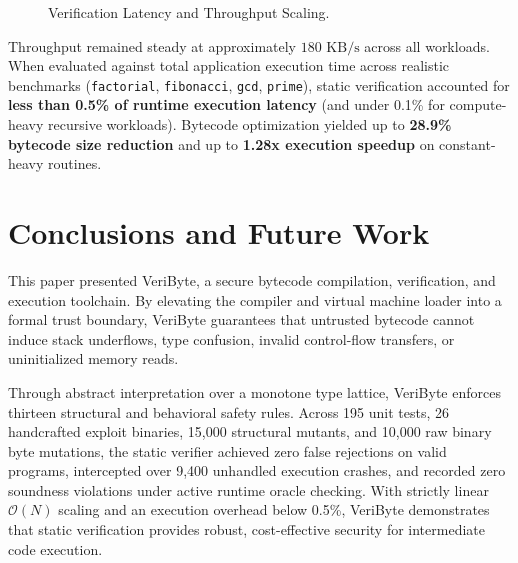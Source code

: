 \documentclass[conference]{IEEEtran}
\begin{document}
\begin{figure}[htbp]
\centering
{}
\caption{Verification Latency and Throughput Scaling.}
\label{fig:scaling}
\end{figure}

Throughput remained steady at approximately $180\text{ KB/s}$ across all workloads. When evaluated against total application execution time across realistic benchmarks (\texttt{factorial}, \texttt{fibonacci}, \texttt{gcd}, \texttt{prime}), static verification accounted for \textbf{less than 0.5\% of runtime execution latency} (and under 0.1\% for compute-heavy recursive workloads). Bytecode optimization yielded up to \textbf{28.9\% bytecode size reduction} and up to \textbf{1.28x execution speedup} on constant-heavy routines.

\section{Conclusions and Future Work}
This paper presented VeriByte, a secure bytecode compilation, verification, and execution toolchain. By elevating the compiler and virtual machine loader into a formal trust boundary, VeriByte guarantees that untrusted bytecode cannot induce stack underflows, type confusion, invalid control-flow transfers, or uninitialized memory reads.

Through abstract interpretation over a monotone type lattice, VeriByte enforces thirteen structural and behavioral safety rules. Across 195 unit tests, 26 handcrafted exploit binaries, 15,000 structural mutants, and 10,000 raw binary byte mutations, the static verifier achieved zero false rejections on valid programs, intercepted over 9,400 unhandled execution crashes, and recorded zero soundness violations under active runtime oracle checking. With strictly linear $\mathcal{O}(N)$ scaling and an execution overhead below 0.5\%, VeriByte demonstrates that static verification provides robust, cost-effective security for intermediate code execution.
\end{document}

